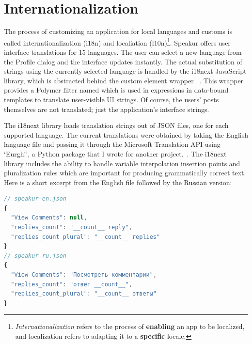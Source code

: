 \section{Internationalization}
\label{sec:i18n}
The process of customizing an application for local languages and customs is called internationalization (i18n) and localiation (l10n)\footnote{
\textit{Internationalization} refers to the process of \textbf{enabling} an app to be localized, and localization refers to adapting it to a \textbf{specific} locale.
}. 
Speakur offers user interface translations for 15 languages.
The user can select a new language from the Profile dialog and the interface updates instantly.
The actual substitution of strings using the currently selected language is handled by the i18next JavaScript library, 
which is abstracted behind the custom element wrapper ~\cite{i18nextcontributors2015}.
This wrapper provides a Polymer filter named \tcode{\$\$} which is used in \tcode{\{\{ \}\}} expressions in data-bound templates to translate user-visible UI strings.
Of course, the users' posts themselves are not translated; just the application's interface strings.

The i18next library loads translation strings out of JSON files, one for each supported language.
The current translations were obtained by taking the English language file and passing it through the Microsoft Translation API using `Eurgh!',
a Python package that I wrote for another project.~\cite{landers2015-b}.
The i18next library includes the ability to handle variable interpolation insertion points and pluralization rules which are important for producing grammatically correct text.
Here is a short excerpt from the English file followed by the Russian version:

\begin{lstlisting}[language=JavaScript,caption=
{String resources for internationalization\index{internationalization}.},label=l:i18n,captionpos=below]
// speakur-en.json
{
  "View Comments": null,
  "replies_count": "__count__ reply",
  "replies_count_plural": "__count__ replies"
}
// speakur-ru.json
{
  "View Comments": "Посмотреть комментарии",
  "replies_count": "ответ __count__",
  "replies_count_plural": "__count__ ответы"
}
\end{lstlisting}


